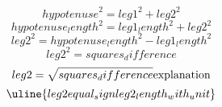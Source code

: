 \[ {hypotenuse}^{2}={leg1}^{2}+{leg2}^{2} \]
\[ {hypotenuse_length}^{2}={leg1_length}^{2}+{leg2}^{2} \]
\[ {leg2}^{2}={hypotenuse_length}^{2}-{leg1_length}^{2} \]
\[ {leg2}^{2}={squares_difference} \]
\[ {leg2}=\sqrt{\mathstrut {squares_difference}}\text{{explanation}}\]
\[ \uline{{leg2}{equal_sign}{leg2_length_with_unit}}\]